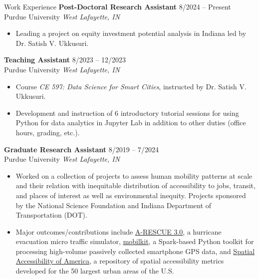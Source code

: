 \documentclass{CV} %
\begin{document}
\begin{rSection}{Work Experience}
    {\bf Post-Doctoral Research Assistant} \hfill {8/2024 – Present}
    \\ Purdue University \hfill {\em West Lafayette, IN}
    \begin{itemize}[noitemsep]
        \item Leading a project on equity investment potential analysis in Indiana led by Dr. Satish V. Ukkusuri.
    \end{itemize}
    
    {\bf Teaching Assistant} \hfill {8/2023 – 12/2023}
    \\ Purdue University \hfill {\em West Lafayette, IN}
    \begin{itemize}[noitemsep]
        \item Course {\em CE 597: Data Science for Smart Cities}, instructed by Dr. Satish V. Ukkusuri.
        \item Development and instruction of 6 introductory tutorial sessions for using Python for data analytics in Jupyter Lab in addition to other duties (office hours, grading, etc.).
    \end{itemize}
    
    {\bf Graduate Research Assistant} \hfill {8/2019 – 7/2024}
    \\ Purdue University \hfill {\em West Lafayette, IN}
    \begin{itemize}[noitemsep]
        \item Worked on a collection of projects to assess human mobility patterns at scale and their relation with inequitable distribution of accessibility to jobs, transit, and places of interest as well as environmental inequity. Projects sponsored by the National Science Foundation and Indiana Department of Transportation (DOT).
        \item Major outcomes/contributions include \href{https://umnilab.github.io/HSEES_doc/}{A-RESCUE 3.0}, a hurricane evacuation micro traffic simulator, \href{https://github.com/rvanxer/mk}{mobilkit}, a Spark-based Python toolkit for processing high-volume passively collected smartphone GPS data, and \href{https://github.com/rvanxer/spr_4711}{Spatial Accessibility of America}, a repository of spatial accessibility metrics developed for the 50 largest urban areas of the U.S.
    \end{itemize}
    

\end{rSection}
\end{document}
